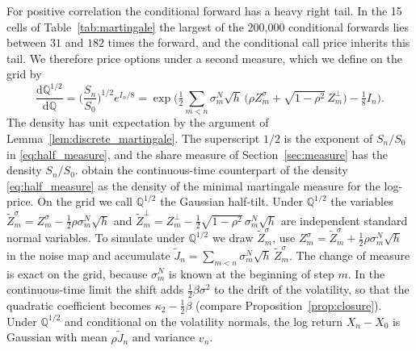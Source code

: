 \documentclass[11pt,a4paper]{article}
\theoremstyle{definition}
\newcommand{\D}{\mathrm{d}}
\newcommand{\Q}{\mathbb{Q}}
\begin{document}
For positive correlation the conditional forward has a heavy right tail. In the 15 cells of Table~\ref{tab:martingale} the largest of the 200{,}000 conditional forwards lies between $31$ and $182$ times the forward, and the conditional call price inherits this tail. We therefore price options under a second measure, which we define on the grid by
\begin{equation}\label{eq:half_measure}
\frac{\D\Q^{1/2}}{\D\Q}=\Big(\frac{S_n}{S_0}\Big)^{1/2}e^{I_n/8}=\exp\Big(\tfrac12\sum_{m<n}\sigma^N_m\sqrt h\,\Big(\rho Z^\sigma_m+\sqrt{1-\rho^2}\,Z^\perp_m\Big)-\tfrac18I_n\Big).
\end{equation}
The density has unit expectation by the argument of Lemma~\ref{lem:discrete_martingale}. The superscript $1/2$ is the exponent of $S_n/S_0$ in \eqref{eq:half_measure}, and the share measure of Section~\ref{sec:measure} has the density $S_n/S_0$. \citet{RheinlaenderSchmutz2013} obtain the continuous-time counterpart of the density \eqref{eq:half_measure} as the density of the minimal martingale measure for the log-price. On the grid we call $\Q^{1/2}$ the Gaussian half-tilt. Under $\Q^{1/2}$ the variables $\tilde Z^\sigma_m=Z^\sigma_m-\tfrac12\rho\sigma^N_m\sqrt h$ and $\tilde Z^\perp_m=Z^\perp_m-\tfrac12\sqrt{1-\rho^2}\,\sigma^N_m\sqrt h$ are independent standard normal variables. To simulate under $\Q^{1/2}$ we draw $\tilde Z^\sigma_m$, use $Z^\sigma_m=\tilde Z^\sigma_m+\tfrac12\rho\sigma^N_m\sqrt h$ in the noise map and accumulate $\tilde J_n=\sum_{m<n}\sigma^N_m\sqrt h\,\tilde Z^\sigma_m$. The change of measure is exact on the grid, because $\sigma^N_m$ is known at the beginning of step $m$. In the continuous-time limit the shift adds $\tfrac12\beta\sigma^2$ to the drift of the volatility, so that the quadratic coefficient becomes $\kappa_2-\tfrac12\beta$ (compare Proposition~\ref{prop:closure}). Under $\Q^{1/2}$ and conditional on the volatility normals, the log return $X_n-X_0$ is Gaussian with mean $\rho\tilde J_n$ and variance $v_n$.
\end{document}
